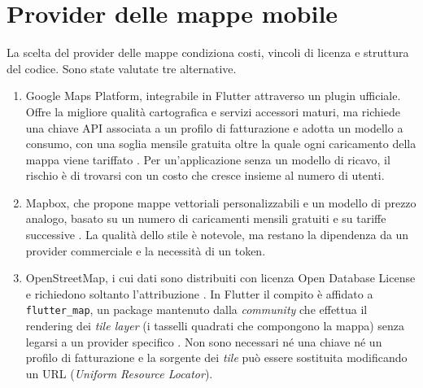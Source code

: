 
\section{Provider delle mappe mobile}\label{sec:piattaforme-cartografiche}

La scelta del provider delle mappe condiziona costi, vincoli di licenza e struttura del codice. %
Sono state valutate tre alternative.

\begin{enumerate}
  \item Google Maps Platform, integrabile in Flutter attraverso un plugin ufficiale.
  Offre la migliore qualità cartografica e servizi accessori maturi, ma richiede una chiave API associata a un profilo di fatturazione
  e adotta un modello a consumo, con una soglia mensile gratuita oltre la quale ogni caricamento della mappa viene tariffato \cite{googleMapsPricing}.
  Per un'applicazione senza un modello di ricavo, il rischio è di trovarsi con un costo che cresce insieme al numero di utenti.
  \item Mapbox, che propone mappe vettoriali personalizzabili e un modello di prezzo analogo, basato su un numero
  di caricamenti mensili gratuiti e su tariffe successive \cite{mapboxPricing}.
  La qualità dello stile è notevole, ma restano la dipendenza da un provider commerciale e la necessità di un token.
  \item OpenStreetMap, i cui dati sono distribuiti con licenza Open Database License e richiedono soltanto
  l'attribuzione \cite{osmCopyright}.
  In Flutter il compito è affidato a \texttt{flutter\_map}, un package mantenuto dalla \textit{community} che effettua il rendering dei \textit{tile layer}
  (i tasselli quadrati che compongono la mappa) senza legarsi a un provider specifico \cite{flutterMapPkg, flutterMapDocs}.
  Non sono necessari né una chiave né un profilo di fatturazione e la sorgente dei \textit{tile}
  può essere sostituita modificando un URL (\textit{Uniform Resource Locator}).
\end{enumerate}


